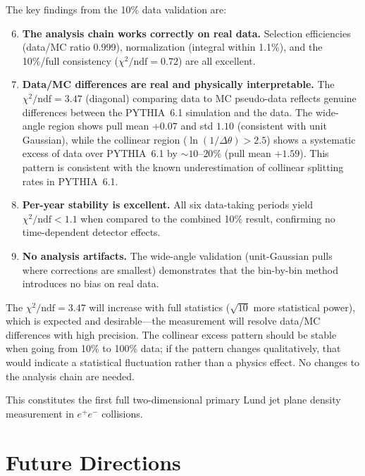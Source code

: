 \documentclass[11pt,a4paper]{article}
\begin{document}
The key findings from the 10\% data validation are:
\begin{enumerate}
\setcounter{enumi}{5}
\item \textbf{The analysis chain works correctly on real data.}
  Selection efficiencies (data/MC ratio 0.999), normalization
  (integral within 1.1\%), and the 10\%/full consistency
  ($\chi^2/\text{ndf} = 0.72$) are all excellent.
\item \textbf{Data/MC differences are real and physically
  interpretable.}  The $\chi^2/\text{ndf} = 3.47$ (diagonal) comparing
  data to MC pseudo-data reflects genuine differences between the
  PYTHIA~6.1 simulation and the data.  The wide-angle region shows
  pull mean $+0.07$ and std $1.10$ (consistent with unit Gaussian),
  while the collinear region ($\ln(1/\Delta\theta) > 2.5$) shows a
  systematic excess of data over PYTHIA~6.1 by $\sim\!10$--$20\%$
  (pull mean $+1.59$).  This pattern is consistent with the known
  underestimation of collinear splitting rates in PYTHIA~6.1.
\item \textbf{Per-year stability is excellent.}  All six data-taking
  periods yield $\chi^2/\text{ndf} < 1.1$ when compared to the
  combined 10\% result, confirming no time-dependent detector effects.
\item \textbf{No analysis artifacts.}  The wide-angle validation
  (unit-Gaussian pulls where corrections are smallest) demonstrates
  that the bin-by-bin method introduces no bias on real data.
\end{enumerate}

The $\chi^2/\text{ndf} = 3.47$ will increase with full statistics
($\sqrt{10}$ more statistical power), which is expected and
desirable---the measurement will resolve data/MC differences with
high precision.  The collinear excess pattern should be stable when
going from 10\% to 100\% data; if the pattern changes qualitatively,
that would indicate a statistical fluctuation rather than a physics
effect.  No changes to the analysis chain are needed.

This constitutes the first full two-dimensional primary Lund jet plane
density measurement in $e^+e^-$ collisions.

\section{Future Directions}
\label{sec:future}
\end{document}
